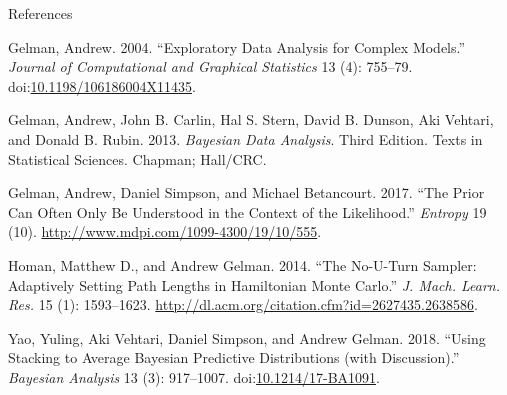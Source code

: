 \documentclass[ignorenonframetext,a4paper]{beamer}
\begin{document}
\begin{frame}{References}

\scriptsize

\hypertarget{refs}{}
\hypertarget{ref-gelman_2004}{}
Gelman, Andrew. 2004. ``Exploratory Data Analysis for Complex Models.''
\emph{Journal of Computational and Graphical Statistics} 13 (4):
755--79.
doi:\href{https://doi.org/10.1198/106186004X11435}{10.1198/106186004X11435}.

\hypertarget{ref-gelman_2013}{}
Gelman, Andrew, John B. Carlin, Hal S. Stern, David B. Dunson, Aki
Vehtari, and Donald B. Rubin. 2013. \emph{Bayesian Data Analysis}. Third
Edition. Texts in Statistical Sciences. Chapman; Hall/CRC.

\hypertarget{ref-gelman_2017}{}
Gelman, Andrew, Daniel Simpson, and Michael Betancourt. 2017. ``The
Prior Can Often Only Be Understood in the Context of the Likelihood.''
\emph{Entropy} 19 (10). \url{http://www.mdpi.com/1099-4300/19/10/555}.

\hypertarget{ref-hoffman_2014}{}
Homan, Matthew D., and Andrew Gelman. 2014. ``The No-U-Turn Sampler:
Adaptively Setting Path Lengths in Hamiltonian Monte Carlo.'' \emph{J.
Mach. Learn. Res.} 15 (1): 1593--1623.
\url{http://dl.acm.org/citation.cfm?id=2627435.2638586}.

\hypertarget{ref-yao_2018}{}
Yao, Yuling, Aki Vehtari, Daniel Simpson, and Andrew Gelman. 2018.
``Using Stacking to Average Bayesian Predictive Distributions (with
Discussion).'' \emph{Bayesian Analysis} 13 (3): 917--1007.
doi:\href{https://doi.org/10.1214/17-BA1091}{10.1214/17-BA1091}.

\end{frame}
\end{document}
